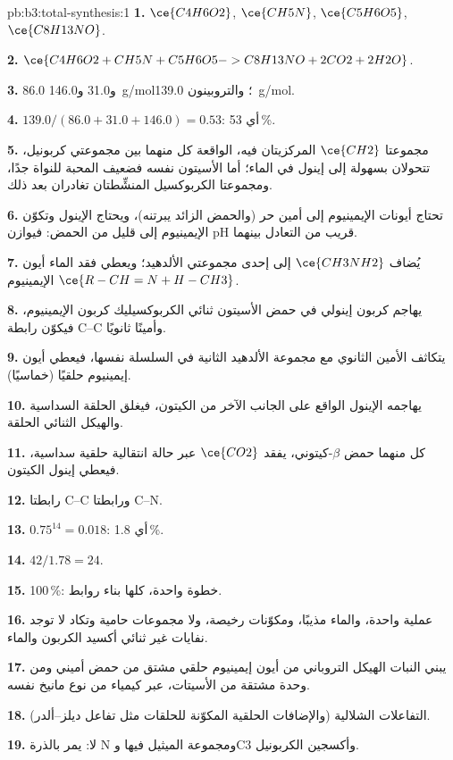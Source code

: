 \begin{solution}{pb:b3:total-synthesis:1}
\textbf{1.} $\ce{C4H6O2}$, $\ce{CH5N}$, $\ce{C5H6O5}$, $\ce{C8H13NO}$.

\textbf{2.} $\ce{C4H6O2 + CH5N + C5H6O5 -> C8H13NO + 2CO2 + 2H2O}$.

\textbf{3.} 86.0 و31.0 و\qty{146.0}{g/mol}؛ والتروبينون \qty{139.0}{g/mol}.

\textbf{4.} $139.0/(86.0 + 31.0 + 146.0) = 0.53$: أي 53\,\%.

\textbf{5.} مجموعتا $\ce{CH2}$ المركزيتان فيه، الواقعة كل منهما بين مجموعتي كربونيل، تتحولان بسهولة إلى إينول في
الماء؛ أما الأسيتون نفسه فضعيف المحبة للنواة جدًا، ومجموعتا الكربوكسيل
المنشِّطتان تغادران بعد ذلك.

\textbf{6.} تحتاج أيونات الإيمينيوم إلى أمين حر (والحمض الزائد يبرتنه)، ويحتاج
الإينول وتكوّن الإيمينيوم إلى قليل من الحمض: فيوازن pH قريب من التعادل بينهما.

\textbf{7.} يُضاف $\ce{CH3NH2}$ إلى إحدى مجموعتي الألدهيد؛ ويعطي فقد الماء أيون الإيمينيوم
$\ce{R-CH=N+H-CH3}$.

\textbf{8.} يهاجم كربون إينولي في حمض الأسيتون ثنائي الكربوكسيليك كربون الإيمينيوم، فيكوّن
رابطة C--C وأمينًا ثانويًا.

\textbf{9.} يتكاثف الأمين الثانوي مع مجموعة الألدهيد الثانية في السلسلة
نفسها، فيعطي أيون إيمينيوم حلقيًا (خماسيًا).

\textbf{10.} يهاجمه الإينول الواقع على الجانب الآخر من الكيتون، فيغلق
الحلقة السداسية والهيكل الثنائي الحلقة.

\textbf{11.} كل منهما حمض $\beta$-كيتوني، يفقد $\ce{CO2}$ عبر حالة انتقالية حلقية سداسية،
فيعطي إينول الكيتون.

\textbf{12.} رابطتا C--C ورابطتا C--N.

\textbf{13.} $0.75^{14} = 0.018$: أي 1.8\,\%.

\textbf{14.} $42/1.78 = 24$.

\textbf{15.} 100\,\%: خطوة واحدة، كلها بناء روابط.

\textbf{16.} عملية واحدة، والماء مذيبًا، ومكوّنات رخيصة، ولا مجموعات حامية 
وتكاد لا توجد نفايات غير ثنائي أكسيد الكربون والماء.

\textbf{17.} يبني النبات الهيكل التروباني من أيون إيمينيوم حلقي مشتق من حمض
أميني ومن وحدة مشتقة من الأسيتات، عبر كيمياء من نوع مانيخ
نفسه.

\textbf{18.} التفاعلات الشلالية (والإضافات الحلقية المكوّنة للحلقات مثل تفاعل
ديلز--ألدر).

\textbf{19.} لا:  يمر بالذرة N ومجموعة الميثيل فيها وC3 وأكسجين
الكربونيل.


\end{solution}
